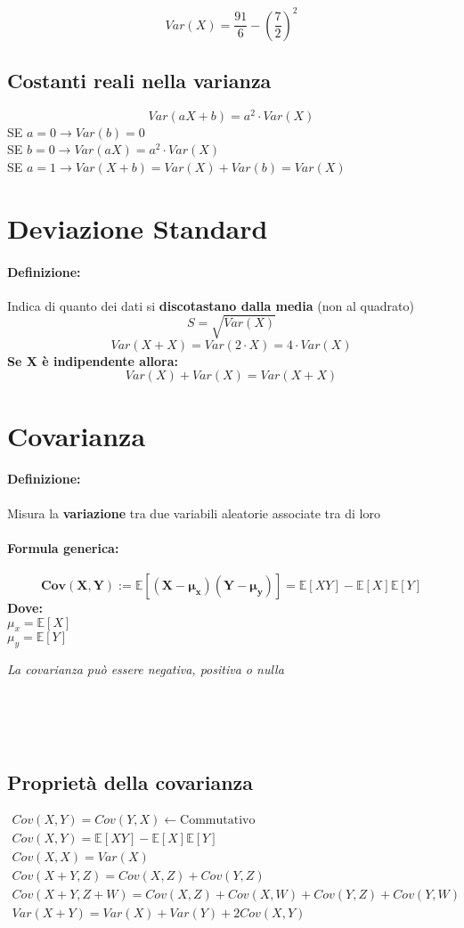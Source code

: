 \documentclass[]{article}
\newcommand{\ev}{\mathbb{E}[X]}
\renewcommand{\ev}[1]{\mathbb{E}[#1]}
\newcommand{\definizione}{\paragraph{Definizione:}}
\newcommand{\formula}{\paragraph{Formula generica:}}
\begin{document}
    \[ Var(X) = \frac{91}{6} - (\frac{7}{2})^2 \]

    \subsection{Costanti reali nella varianza}
    \[ Var(aX + b) = a^2 \cdot Var(X) \]
    SE $a = 0 \longrightarrow Var(b) = 0$ \\
    SE $b = 0 \longrightarrow Var(aX) = a^2 \cdot Var(X)$ \\
    SE $a = 1 \longrightarrow Var(X + b) = Var(X) + {Var(b)} = Var(X)$ \\

    \section{Deviazione Standard}
    \definizione Indica di quanto dei dati si \textbf{discotastano dalla media} (non al quadrato)
    \[ S = \sqrt{Var(X)} \]
    \[ Var(X + X) = Var(2 \cdot X) = 4 \cdot Var(X) \]
    \linebreak[1]
    \textbf{Se X è indipendente allora:}
    \[ Var(X) + Var(X) = Var(X + X) \]

    \section{Covarianza}
    \definizione Misura la \textbf{variazione} tra due variabili aleatorie associate tra di loro
    \formula \[ \boldsymbol{Cov(X,Y) := \ev{(X - \mu_x) (Y - \mu_y)}} = \ev{XY} - \ev{X} \ev{Y} \]
    \textbf{Dove:} \\
    $ \mu_x = \ev{X} $ \\
    $ \mu_y = \ev{Y} $

    \begin{center} 
        \textit{La covarianza può essere negativa, positiva o nulla } 
    \end{center}
     \\
     \\
     \\

    \subsection{Proprietà della covarianza}
    \begin{multline*}
        Cov(X, Y) = Cov(Y, X) \longleftarrow \text{Commutativo} \\
        Cov(X, Y) = \ev{XY} - \ev{X} \ev{Y} \\
        Cov(X, X) = Var(X) \\
        Cov(X+Y, Z) = Cov(X, Z) + Cov(Y, Z) \\
        Cov(X+Y, Z+W) = Cov(X, Z) + Cov(X, W) + Cov(Y, Z) + Cov(Y, W) \\
        Var(X + Y) = Var(X) + Var(Y) + 2 Cov(X, Y)
    \end{multline*}
\end{document}
